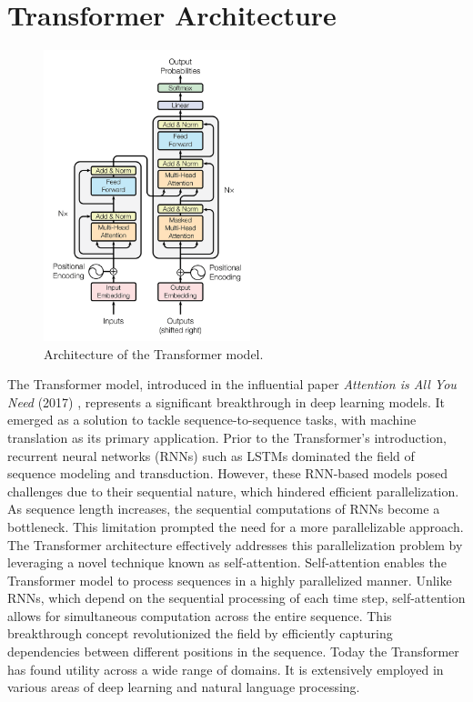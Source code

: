 \documentclass[a4paper,10pt]{report}
\begin{document}
\section{Transformer Architecture}
\begin{figure}
  \centering
  \includegraphics[width=6cm]{img/transformer.png}
  \caption{Architecture of the Transformer model. \cite{VaswaniAttentionIsAll}}
  \label{fig:transformer}
\end{figure}
The Transformer model, introduced in the influential paper \textit{Attention is All You Need} (2017) \cite{VaswaniAttentionIsAll}, represents a significant breakthrough in deep learning models. It emerged as a solution to tackle sequence-to-sequence tasks, with machine translation as its primary application. Prior to the Transformer's introduction, recurrent neural networks (RNNs) such as LSTMs dominated the field of sequence modeling and transduction. However, these RNN-based models posed challenges due to their sequential nature, which hindered efficient parallelization. As sequence length increases, the sequential computations of RNNs become a bottleneck. This limitation prompted the need for a more parallelizable approach. The Transformer architecture effectively addresses this parallelization problem by leveraging a novel technique known as self-attention. Self-attention enables the Transformer model to process sequences in a highly parallelized manner. Unlike RNNs, which depend on the sequential processing of each time step, self-attention allows for simultaneous computation across the entire sequence. This breakthrough concept revolutionized the field by efficiently capturing dependencies between different positions in the sequence. \cite{VaswaniAttentionIsAll} Today the Transformer has found utility across a wide range of domains. It is extensively employed in various areas of deep learning and natural language processing. \cite{LinSurvey}
\end{document}
